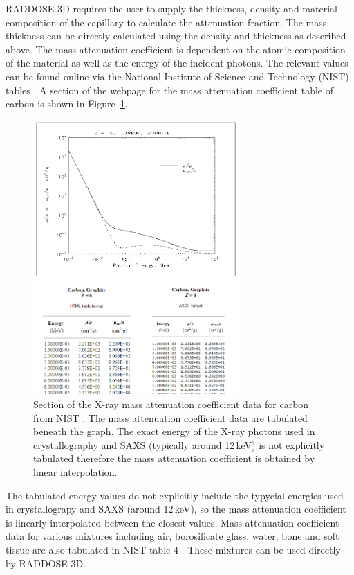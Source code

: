RADDOSE-3D requires the user to supply the thickness, density and material composition of the capillary to calculate the attenuation fraction.
The mass thickness can be directly calculated using the density and thickness as described above.
The mass attenuation coefficient is dependent on the atomic composition of the material as well as the energy of the incident photons.
The relevant values can be found online via the National Institute of Science and Technology (NIST) tables \cite{nisttable3,nisttable4}.
A section of the webpage for the mass attenuation coefficient table of carbon is shown in Figure~\ref{fig:NIST table for carbon}.
\begin{figure}
    \centering
    \includegraphics[width=0.7\textwidth]{figures/saxs/nist_table_carbon.png}
    \caption[X-ray mass attenuation coefficient data for carbon from NIST.]{Section of the X-ray mass attenuation coefficient data for carbon from NIST \cite{nisttable3}. The mass attenuation coefficient data are tabulated beneath the graph. The exact energy of the X-ray photons used in crystallography and SAXS (typically around 12\,keV) is not explicitly tabulated therefore the mass attenuation coefficient is obtained by linear interpolation.}
    \label{fig:NIST table for carbon}
\end{figure}
The tabulated energy values do not explicitly include the typycial energies used in crystallograpy and SAXS (around 12\,keV), so the mass attenuation coefficient is linearly interpolated between the closest values.
Mass attenuation coefficient data for various mixtures including air, borosilicate glass, water, bone and soft tissue are also tabulated in NIST table 4 \cite{nisttable4}.
These mixtures can be used directly by RADDOSE-3D.

